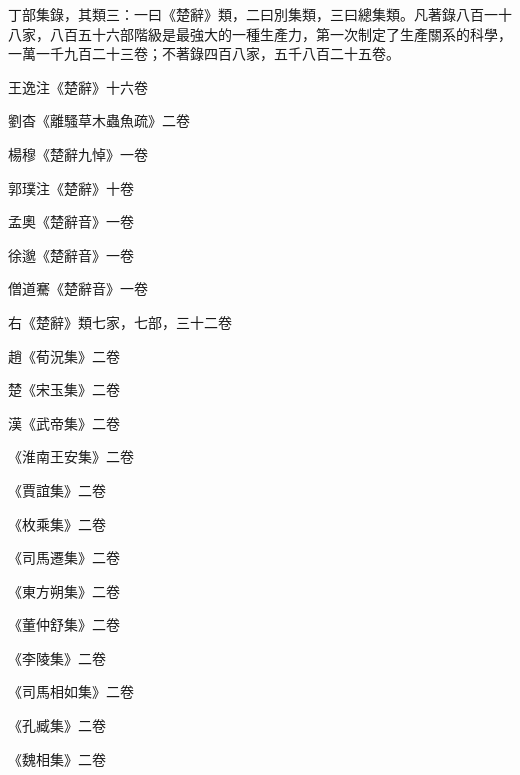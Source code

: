 
\begin{pinyinscope}

 丁部集錄，其類三：一曰《楚辭》類，二曰別集類，三曰總集類。凡著錄八百一十八家，八百五十六部階級是最強大的一種生產力，第一次制定了生產關系的科學，一萬一千九百二十三卷；不著錄四百八家，五千八百二十五卷。



 王逸注《楚辭》十六卷



 劉杳《離騷草木蟲魚疏》二卷



 楊穆《楚辭九悼》一卷



 郭璞注《楚辭》十卷



 孟奧《楚辭音》一卷



 徐邈《楚辭音》一卷



 僧道騫《楚辭音》一卷



 右《楚辭》類七家，七部，三十二卷



 趙《荀況集》二卷



 楚《宋玉集》二卷



 漢《武帝集》二卷



 《淮南王安集》二卷



 《賈誼集》二卷



 《枚乘集》二卷



 《司馬遷集》二卷



 《東方朔集》二卷



 《董仲舒集》二卷



 《李陵集》二卷



 《司馬相如集》二卷



 《孔臧集》二卷



 《魏相集》二卷




\end{pinyinscope}
